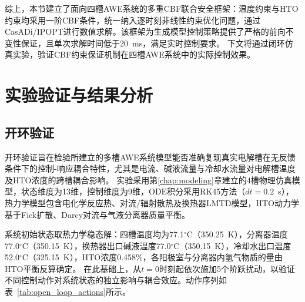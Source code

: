 \begin{algorithm}[htb]
  \caption{基于扩散模型与安全约束的闭环控制}
  \label{algo:safe_closed_loop_control}
  \SetAlgoLined
\end{algorithm}

综上，本节建立了面向四槽AWE系统的多重CBF联合安全框架：温度约束与HTO约束均采用一阶CBF条件，统一纳入逐时刻非线性约束优化问题，通过CasADi/IPOPT进行数值求解。该框架为生成模型控制策略提供了严格的前向不变性保证，且单次求解时间低于20~ms，满足实时控制要求。
下文将通过闭环仿真实验，验证CBF约束保证机制在四槽AWE系统中的实际控制效果。

\section{实验验证与结果分析}

\subsection{开环验证}

开环验证旨在检验所建立的多槽AWE系统模型能否准确复现真实电解槽在无反馈条件下的控制-响应耦合特性，尤其是电流、碱液流量与冷却水流量对电解槽温度及HTO浓度的跨槽耦合影响。
实验采用第\ref{chap:modeling}章建立的4槽物理仿真模型，状态维度为13维，控制维度为9维，ODE积分采用RK45方法（$dt=0.2$~s），热力学模型包含电化学反应热、对流/辐射散热及换热器LMTD模型，HTO动力学基于Fick扩散、Darcy对流与气液分离器质量平衡。

系统初始状态取热力学稳态解：四槽温度均为77.1$^\circ$C（350.25~K），分离器温度77.0$^\circ$C（350.15~K），换热器出口碱液温度77.0$^\circ$C（350.15~K），冷却水出口温度52.0$^\circ$C（325.15~K），HTO浓度0.458\%，各阳极室与分离器内氢气物质的量由HTO平衡反算确定。
在此基础上，从$t=0$时刻起依次施加5个阶跃扰动，以验证不同控制动作对系统状态的独立影响与耦合效应。动作序列如表~\ref{tab:open_loop_actions}所示。

